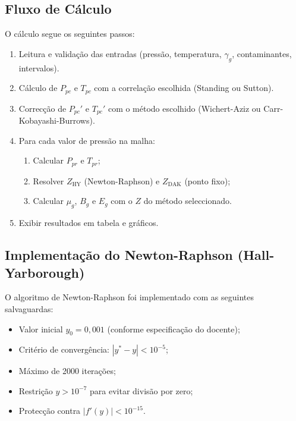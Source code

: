 \documentclass[12pt,a4paper]{article}
\begin{document}
\subsection{Fluxo de Cálculo}

O cálculo segue os seguintes passos:
\begin{enumerate}[noitemsep]
  \item Leitura e validação das entradas (pressão, temperatura, $\gamma_g$,
    contaminantes, intervalos).
  \item Cálculo de $P_{pc}$ e $T_{pc}$ com a correlação escolhida
    (Standing ou Sutton).
  \item Correcção de $P_{pc}'$ e $T_{pc}'$ com o método escolhido
    (Wichert-Aziz ou Carr-Kobayashi-Burrows).
  \item Para cada valor de pressão na malha:
    \begin{enumerate}[noitemsep, label=\alph*)]
      \item Calcular $P_{pr}$ e $T_{pr}$;
      \item Resolver $Z_{\text{HY}}$ (Newton-Raphson) e
            $Z_{\text{DAK}}$ (ponto fixo);
      \item Calcular $\mu_g$, $B_g$ e $E_g$ com o $Z$ do método seleccionado.
    \end{enumerate}
  \item Exibir resultados em tabela e gráficos.
\end{enumerate}

\subsection{Implementação do Newton-Raphson (Hall-Yarborough)}

O algoritmo de Newton-Raphson foi implementado com as seguintes salvaguardas:
\begin{itemize}[noitemsep]
  \item Valor inicial $y_0 = 0{,}001$ (conforme especificação do docente);
  \item Critério de convergência: $|y^* - y| < 10^{-5}$;
  \item Máximo de 2000 iterações;
  \item Restrição $y > 10^{-7}$ para evitar divisão por zero;
  \item Protecção contra $|f'(y)| < 10^{-15}$.
\end{itemize}
\end{document}
